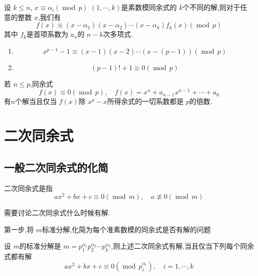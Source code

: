 \documentclass[lang=cn,12pt,color=green,fontset=none]{elegantbook}
\begin{document}
\begin{theorem}
    设 \(  k\le n  \), \(  x \equiv  \alpha _{i}\left( \operatorname{mod}\,p \right)   \)  \(  \left(  1,\cdots,k  \right)   \)是素数模同余式的 \(  k  \)个不同的解,则对于任意的整数 \(  x  \),我们有 \[
    f\left( x \right)\equiv \left( x- \alpha _1  \right)\left( x- \alpha _2  \right)\cdots \left( x- \alpha _k  \right)    f_{k}\left( x \right)\left( \operatorname{mod}\,p \right)  
    \]   其中 \(  f_{k}  \)是首项系数为 \(  a_{n}  \)的 \(  n-k  \)次多项式.   
\end{theorem}

\begin{theorem}
    \begin{enumerate}
        \item  \[
        x^{p-1}-1 \equiv \left( x-1 \right)\left( x-2 \right)\cdots \left( x-\left( p-1 \right)  \right) \left( \operatorname{mod}\,p \right)    
        \]
        \item \[
        \left( p-1 \right)!+ 1\equiv 0\left( \operatorname{mod}\,p \right)  
        \]
    \end{enumerate}
    
\end{theorem}

\begin{theorem}
    若 \(  n\le p  \),同余式 \[
    f\left( x \right)\equiv 0\left( \operatorname{mod}\,p \right),\quad f\left( x \right)= x^{n}+ a_{n-1}x^{n-1}+ \cdots + a_0   
    \]有\(  n  \)个解当且仅当 \(  f\left( x \right)   \)除 \(  x^{p}-x  \)所得余式的一切系数都是 \(  p  \)的倍数.        
\end{theorem}
\chapter{二次同余式}

\section{一般二次同余式的化简}

\begin{definition}
    二次同余式是指 \[
    ax^{2}+ bx+ c \equiv 0\left( \operatorname{mod}\,m \right) ,\quad a \not\equiv  0\left( \operatorname{mod}\,m \right) 
    \]
\end{definition}

需要讨论二次同余式什么时候有解.

第一步,将 \(  m  \)标准分解,化简为每个准素数模的同余式是否有解的问题
\begin{theorem}
    设 \(  m  \)的标准分解是 \(  m =  p_1^{ \alpha_1 }p_2^{ \alpha_2 }\cdots p_{k}^{ \alpha _k }  \),则上述二次同余式有解,当且仅当下列每个同余式都有解 \[
        ax^{2}+ bx+ c\equiv 0 \left( \operatorname{mod}\,p_{i}^{ \alpha _{i}} \right),\quad  i=  1,\cdots,k  
        \]  
\end{theorem}
\end{document}
